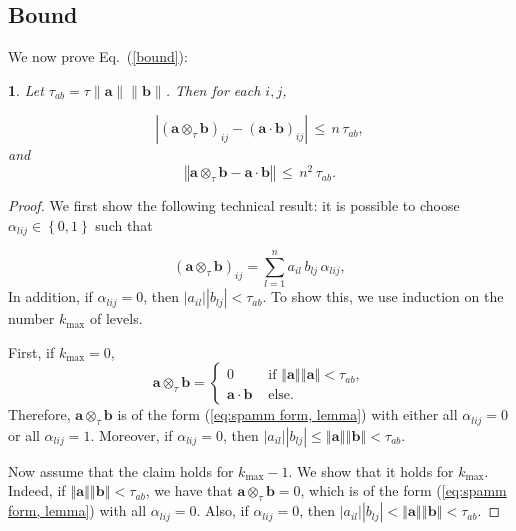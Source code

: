 \documentclass[letterpaper,twocolumn,amsmath,amsfont,amssymb,english,aps,jcp,preprintnumbers,groupaddress,nofootinbib,tightenlines,floatfix]{revtex4}
\newcommand{\mat}[1]{\boldsymbol{#1}}
\newcommand{\ot}{  {\scriptstyle \otimes}_{ \tau } }
\theoremstyle{plain}
\theoremstyle{remark}
\theoremstyle{plain}
\newtheorem{prop}[thm]{\protect\propositionname}
\providecommand{\propositionname}{Proposition}
\begin{document}
\subsection{Bound}
We now prove Eq.~(\ref{bound}):

\begin{prop}
\label{lem:SpAMM mult, prop}
Let $\tau_{ab} = \tau \| \mat{a} \| \| \mat{b} \| $. Then for each $i,j$,

\[
\left|\left(\mat{a}\ot \mat{b}\right)_{ij}-\left( \mat{a} \cdot \mat{b} \right)_{ij}\right| \, \leq \, n \,  \tau_{ab},
\]
and
\[
\left\Vert \mat{a} \ot \mat{b}- \mat{a} \cdot \mat{b} \right\Vert \, \leq  \, n^{2} \,\tau_{ab}.
\]
\end{prop}

\begin{proof}


We first show the following technical result: it is possible to choose $\alpha_{lij}\in\left\{ 0,1\right\} $ such that 

\begin{equation}
\left( \mat{a} \ot \mat{b}\right)_{ij}=\sum_{l=1}^{n}a_{il}\, b_{lj} \, \alpha_{lij},\label{eq:spamm form, lemma}
\end{equation}
In addition, if $\alpha_{lij}=0$, then \textup{$\left|a_{il}\right|\left|b_{lj}\right|<\tau_{ab}$}. To show this, we use 
induction on the number $k_{\max}$ of levels. 

First, if $k_{\max}=0$,
\[
\mat{a} \ot \mat{b}=\begin{cases}
0 & \,\,\text{if}\,\,\left\Vert \mat{a} \right\Vert \left\Vert \mat{a} \right\Vert <\tau_{ab},\\
\mat{a} \cdot \mat{b} & \,\,\text{else}.
\end{cases}
\]
Therefore, $\mat{a}\ot \mat{b}$ is of the form (\ref{eq:spamm form, lemma})
with either all $\alpha_{lij}=0$ or all $\alpha_{lij}=1$. Moreover,
if $\alpha_{lij}=0$, then $\left|a_{il}\right|\left| b_{lj}\right|\leq\left\Vert \mat{a} \right\Vert 
 \left\Vert \mat{b}\right\Vert <\tau_{ab}$. 

Now assume that the claim holds for $k_{\max}-1$. We show that it
holds for $k_{\max}$. Indeed, if $\left\Vert \mat{a} \right\Vert \left\Vert \mat{b} \right\Vert < \tau_{ab}$,
we have that $\mat{a} \ot \mat{b}=0$, which is of the form (\ref{eq:spamm form, lemma})
with all $\alpha_{lij}=0$. Also, if $\alpha_{lij}=0$, then $\left| a_{il}\right|\left|b_{lj}\right|
<\left\Vert \mat{a}\right\Vert \left\Vert\mat{b}\right\Vert <\tau_{ab}$.


\end{proof}
\end{document}
